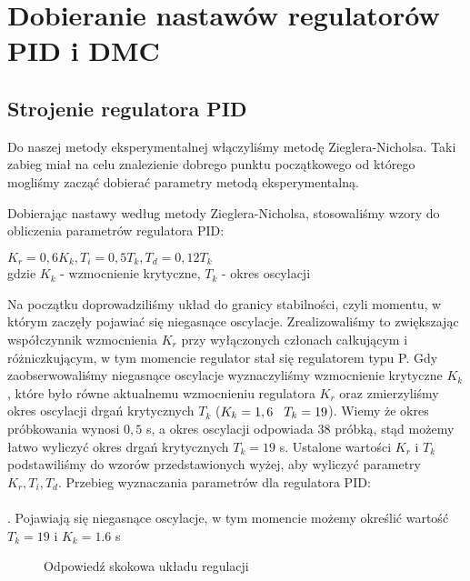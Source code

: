 \chapter{Dobieranie nastawów regulatorów PID i DMC}
\label{zad5}

\section{Strojenie regulatora PID}
\label{zad5_PID_wykresy}

Do naszej metody eksperymentalnej włączyliśmy metodę Zieglera-Nicholsa. Taki zabieg miał na celu znalezienie dobrego punktu początkowego od którego mogliśmy zacząć dobierać parametry metodą eksperymentalną.

Dobierając nastawy według metody Zieglera-Nicholsa, stosowaliśmy wzory do obliczenia parametrów regulatora PID: 
\begin{center}
$K_{r}=0,6K_{k}, T_{i}=0,5T_{k}, T_{d}=0,12T_{k}$
\\gdzie $K_{k}$ - wzmocnienie krytyczne, $T_{k}$ - okres oscylacji
\end{center}
Na początku doprowadziliśmy układ do granicy stabilności, czyli momentu, w którym zaczęły pojawiać się niegasnące oscylacje. Zrealizowaliśmy to zwiększając współczynnik wzmocnienia $K_{r}$ przy wyłączonych członach całkującym i różniczkującym, w tym momencie regulator stał się regulatorem typu P. Gdy zaobserwowaliśmy niegasnące oscylacje wyznaczyliśmy wzmocnienie krytyczne $K_{k}$, które było równe aktualnemu wzmocnieniu regulatora $K_{r}$ oraz zmierzyliśmy okres oscylacji drgań krytycznych $T_{k}$ ($K_{k} = 1,6 \hspace{0.3 cm} T_{k}=19$). Wiemy że okres próbkowania wynosi $0,5$ s, a okres oscylacji odpowiada $38$ próbką, stąd możemy łatwo wyliczyć okres drgań krytycznych $T_{k}=19$ s. Ustalone wartości $K_{r}$ i $T_{k}$ podstawiliśmy do wzorów przedstawionych wyżej, aby wyliczyć parametry $K_{r}, T_{i}, T_{d}$. 
\newpage
Przebieg wyznaczania parametrów dla regulatora PID:
~\\\\
. Pojawiają się niegasnące oscylacje, w tym momencie możemy określić wartość $T_{k}=19$ i $K_{k}=1.6$ s
\begin{figure}[h]
    \centering
    \caption{Odpowiedź skokowa układu regulacji}
    \label{zad5_niegasnące_oscylacje}
\end{figure}

